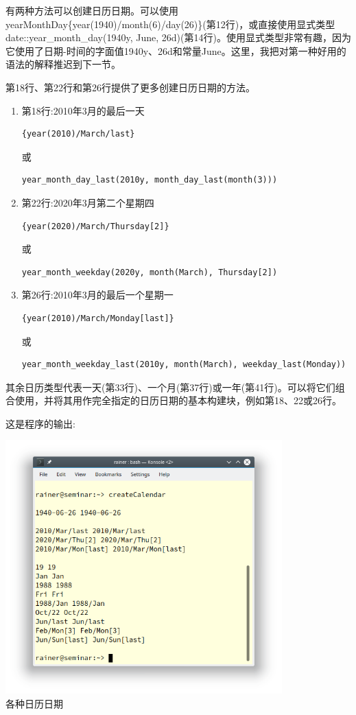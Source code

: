 有两种方法可以创建日历日期。可以使用yearMonthDay\{year(1940)/month(6)/day(26)\}(第12行)，或直接使用显式类型date::year\_month\_day(1940y, June, 26d)(第14行)。使用显式类型非常有趣，因为它使用了日期-时间的字面值1940y、26d和常量June。这里，我把对第一种好用的语法的解释推迟到下一节。

第18行、第22行和第26行提供了更多创建日历日期的方法。

\begin{enumerate}
\item 
第18行:2010年3月的最后一天
\begin{lstlisting}[style=styleCXX]
{year(2010)/March/last}
\end{lstlisting}
或
\begin{lstlisting}[style=styleCXX]
year_month_day_last(2010y, month_day_last(month(3)))
\end{lstlisting}

\item 
第22行:2020年3月第二个星期四
\begin{lstlisting}[style=styleCXX]
{year(2020)/March/Thursday[2]}
\end{lstlisting}
或
\begin{lstlisting}[style=styleCXX]
year_month_weekday(2020y, month(March), Thursday[2])
\end{lstlisting}

\item 
第26行:2010年3月的最后一个星期一
\begin{lstlisting}[style=styleCXX]
{year(2010)/March/Monday[last]}
\end{lstlisting}
或
\begin{lstlisting}[style=styleCXX]
year_month_weekday_last(2010y, month(March), weekday_last(Monday))
\end{lstlisting}
\end{enumerate}

其余日历类型代表一天(第33行)、一个月(第37行)或一年(第41行)。可以将它们组合使用，并将其用作完全指定的日历日期的基本构建块，例如第18、22或26行。

这是程序的输出:

\begin{center}
\includegraphics[width=0.8\textwidth]{content/3/chapter5/images/20.png}\\
各种日历日期
\end{center}


